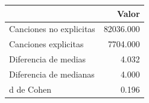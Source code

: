 \begin{tabular}{lr}
\toprule
 & Valor \\
\midrule
Canciones no explicitas & 82036.000 \\
Canciones explicitas & 7704.000 \\
Diferencia de medias & 4.032 \\
Diferencia de medianas & 4.000 \\
d de Cohen & 0.196 \\
\bottomrule
\end{tabular}
